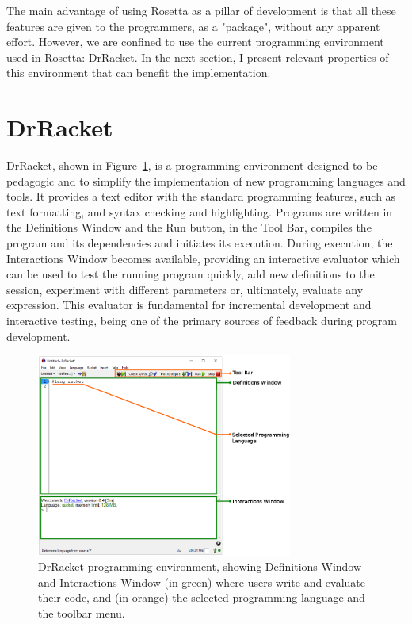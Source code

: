 The main advantage of using Rosetta as a pillar of development is that all these features are given to the programmers, as a "package", without any apparent effort. However, we are confined to use the current programming environment used in Rosetta: DrRacket. In the next section, I present relevant properties of this environment that can benefit the implementation. 

\section{DrRacket}

DrRacket, shown in Figure~\ref{fig:drracket-gui}, is a programming environment designed to be pedagogic and to simplify the implementation of new programming languages and tools. It provides a text editor with the standard programming features, such as text formatting, and syntax checking and highlighting. Programs are written in the Definitions Window and the Run button, in the Tool Bar, compiles the program and its dependencies and initiates its execution. During execution, the Interactions Window becomes available, providing an interactive evaluator which can be used to test the running program quickly, add new definitions to the session, experiment with different parameters or, ultimately, evaluate any expression. This evaluator is fundamental for incremental development and interactive testing, being one of the primary sources of feedback during program development.

\begin{figure}[!htbp]
  \centering
  \includegraphics[width=0.75\textwidth]{images/drracket-gui}
    \caption{DrRacket programming environment, showing Definitions Window and Interactions Window (in green) where users write and evaluate their code, and (in orange) the selected programming language and the toolbar menu.}
  \label{fig:drracket-gui}
\end{figure}

